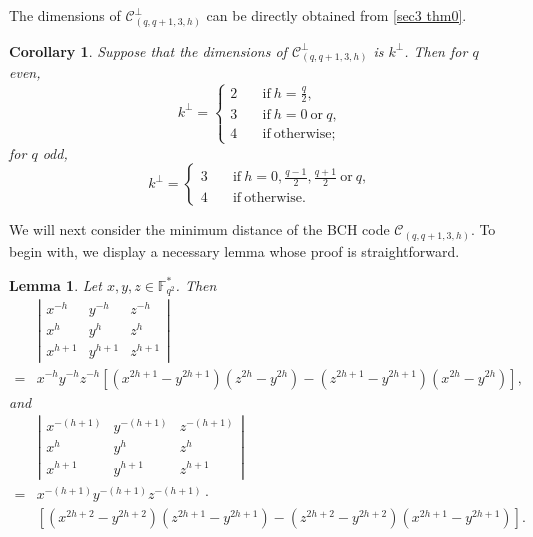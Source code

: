 \documentclass[10pt]{article}%
\newtheorem{lemma}{Lemma}
\newtheorem{corollary}{Corollary}
\begin{document}
	The dimensions of $\mathcal{C}_{(q,q+1,3,h)}^\perp$ can be directly obtained from \cref{sec3 thm0}.
	\begin{corollary}\label{sec3 cor0}
		Suppose that the dimensions of $\mathcal{C}_{(q,q+1,3,h)}^\perp$ is $k^\perp$. Then for $q$ even,
		\begin{equation*}
			k^\perp=\left\{\begin{array}{ll}
				2\quad & \mathrm{if}\ h=\frac{q}{2},\\
				3\quad & \mathrm{if}\ h=0\ \mathrm{or}\ q,\\
				4\quad & \mathrm{if}\ \mathrm{otherwise};
			\end{array}\right.
		\end{equation*}
		for $q$ odd,
		\begin{equation*}
			k^\perp=\left\{\begin{array}{ll}
				3\quad & \mathrm{if}\ h=0,\frac{q-1}{2},\frac{q+1}{2}\ \mathrm{or}\ q,\\
				4\quad & \mathrm{if}\ \mathrm{otherwise}.
			\end{array}\right.
		\end{equation*}
	\end{corollary}
	
	
	We will next consider the minimum distance of the BCH code $\mathcal{C}_{(q,q+1,3,h)}$. To begin with, we display a necessary lemma whose proof is straightforward.
	\begin{lemma}
		\label{sec3 lem1}
		Let $x, y, z \in \mathbb{F}_{q^2}^{\ast}$. Then
		\begin{equation*}
			\begin{aligned}&\left|\begin{array}{lll}
					x^{-h} & y^{-h} & z^{-h}\\ x^h & y^h & z^h\\ x^{h+1} & y^{h+1} & z^{h+1}
				\end{array}\right|\\
				=&x^{-h}y^{-h}z^{-h}\left[\left(x^{2h+1}-y^{2h+1}\right)\left(z^{2h}-y^{2h}\right)-\left(z^{2h+1}-y^{2h+1}\right)\left(x^{2h}-y^{2h}\right)\right],
			\end{aligned}
		\end{equation*}
		and 
		\begin{equation*}
			\begin{aligned}
				&\left|\begin{array}{lll}x^{-(h+1)} & y^{-(h+1)} & z^{-(h+1)}\\ x^h & y^h & z^h\\ x^{h+1} & y^{h+1} & z^{h+1}\end{array}\right|\\
				=&x^{-(h+1)}y^{-(h+1)}z^{-(h+1)}\cdot\\
				&\left[\left(x^{2h+2}-y^{2h+2}\right)\left(z^{2h+1}-y^{2h+1}\right)-\left(z^{2h+2}-y^{2h+2}\right)\left(x^{2h+1}-y^{2h+1}\right)\right].
			\end{aligned}
		\end{equation*}
	\end{lemma}
	
\end{document}
